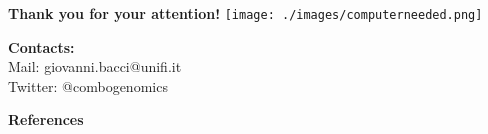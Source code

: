 \documentclass[10pt]{beamer}
\begin{document}
\begin{frame}
	\begin{center}
		{\huge\textbf{Thank you for your attention!}}
		\texttt{[image: ./images/computerneeded.png]}	
	\end{center}
	\let\thefootnote\relax\small{\textbf{Contacts:}\\ Mail: giovanni.bacci@unifi.it \\ Twitter: @combogenomics}
\end{frame}

\begin{frame}[allowframebreaks, t]
	\vspace{2mm}
	\textbf{\Large{References}}
	\vspace{2mm}	
	\tiny
	
\end{frame}
\end{document}
